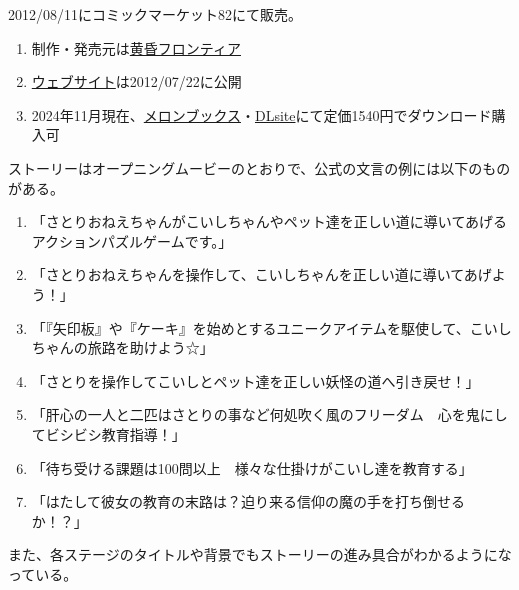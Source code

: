 

%




2012/08/11にコミックマーケット82にて販売。
\begin{enumerate}[label={\sarrow}]
\item 制作・発売元は\href{http://tasofro.net/}{黄昏フロンティア}
\item \href{http://tasofro.net/satori/}{ウェブサイト}は2012/07/22に公開
\item 2024年11月現在、\href{https://www.melonbooks.co.jp/detail/detail.php?product_id=967172}{メロンブックス}・\href{https://www.dlsite.com/home/work/=/product_id/RJ144848.html}{DLsite}にて定価1540円でダウンロード購入可
\end{enumerate}



ストーリーはオープニングムービーのとおりで、公式の文言の例には以下のものがある。
\begin{enumerate}[label={\sarrow}]
\item 「さとりおねえちゃんがこいしちゃんやペット達を正しい道に導いてあげるアクションパズルゲームです。」
\item 「さとりおねえちゃんを操作して、こいしちゃんを正しい道に導いてあげよう！」
\item 「『矢印板』や『ケーキ』を始めとするユニークアイテムを駆使して、こいしちゃんの旅路を助けよう☆」
\item 「さとりを操作してこいしとペット達を正しい妖怪の道へ引き戻せ！」
\item 「肝心の一人と二匹はさとりの事など何処吹く風のフリーダム　心を鬼にしてビシビシ教育指導！」
\item 「待ち受ける課題は100問以上　様々な仕掛けがこいし達を教育する」
\item 「はたして彼女の教育の末路は？迫り来る信仰の魔の手を打ち倒せるか！？」
\end{enumerate}
また、各ステージのタイトルや背景でもストーリーの進み具合がわかるようになっている。


